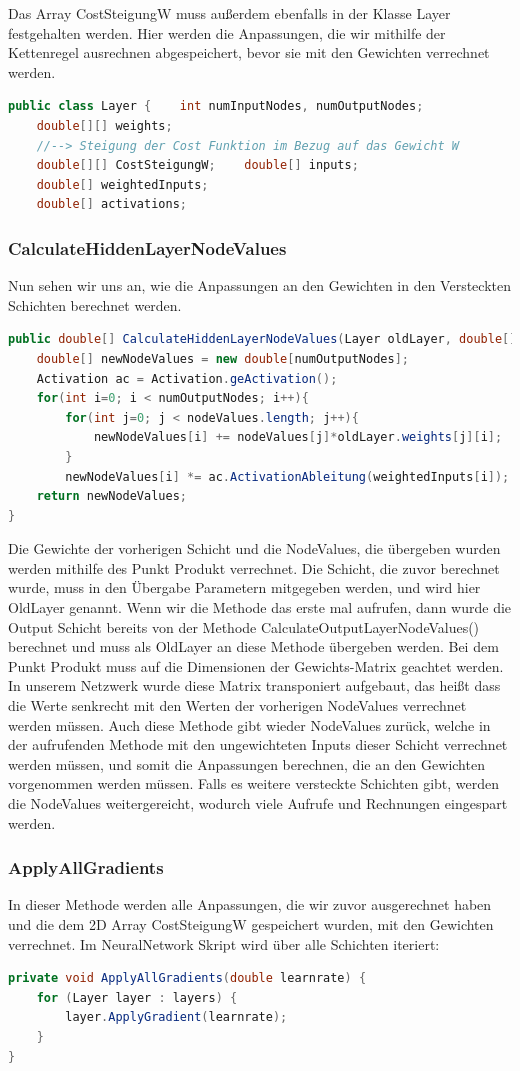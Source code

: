 \documentclass[12pt]{article}
\begin{document}
Das Array CostSteigungW muss außerdem ebenfalls in der Klasse Layer festgehalten werden. Hier werden die Anpassungen, die wir mithilfe der Kettenregel ausrechnen abgespeichert, bevor sie mit den Gewichten verrechnet werden.\begin{lstlisting}[language=Java]
public class Layer {    int numInputNodes, numOutputNodes;
    double[][] weights;
    //--> Steigung der Cost Funktion im Bezug auf das Gewicht W
    double[][] CostSteigungW;    double[] inputs;
    double[] weightedInputs;
    double[] activations;
\end{lstlisting}
\subsubsection{CalculateHiddenLayerNodeValues}Nun sehen wir uns an, wie die Anpassungen an den Gewichten in den Versteckten Schichten berechnet werden.\begin{lstlisting}[language=Java]
public double[] CalculateHiddenLayerNodeValues(Layer oldLayer, double[] nodeValues) {
    double[] newNodeValues = new double[numOutputNodes];
    Activation ac = Activation.geActivation();
    for(int i=0; i < numOutputNodes; i++){
        for(int j=0; j < nodeValues.length; j++){
            newNodeValues[i] += nodeValues[j]*oldLayer.weights[j][i];
        } 
        newNodeValues[i] *= ac.ActivationAbleitung(weightedInputs[i]);
    return newNodeValues;
}
\end{lstlisting}
Die Gewichte der vorherigen Schicht und die NodeValues, die übergeben wurden werden mithilfe des Punkt Produkt verrechnet. Die Schicht, die zuvor berechnet wurde, muss in den Übergabe Parametern mitgegeben werden, und wird hier OldLayer genannt. Wenn wir die Methode das erste mal aufrufen, dann wurde die Output Schicht bereits von der Methode CalculateOutputLayerNodeValues() berechnet und muss als OldLayer an diese Methode übergeben werden.
Bei dem Punkt Produkt muss auf die Dimensionen der Gewichts-Matrix geachtet werden. In unserem Netzwerk wurde diese Matrix transponiert aufgebaut, das heißt dass die Werte senkrecht mit den Werten der vorherigen NodeValues verrechnet werden müssen. Auch diese Methode gibt wieder NodeValues zurück, welche in der aufrufenden Methode mit den ungewichteten Inputs dieser Schicht verrechnet werden müssen, und somit die Anpassungen berechnen, die an den Gewichten vorgenommen werden müssen. Falls es weitere versteckte Schichten gibt, werden die NodeValues weitergereicht, wodurch viele Aufrufe und Rechnungen eingespart werden.\subsubsection{ApplyAllGradients}In dieser Methode werden alle Anpassungen, die wir zuvor ausgerechnet haben und die dem 2D Array CostSteigungW gespeichert wurden, mit den Gewichten verrechnet. Im NeuralNetwork Skript wird über alle Schichten iteriert:\begin{lstlisting}[language=Java]
private void ApplyAllGradients(double learnrate) {
    for (Layer layer : layers) {
        layer.ApplyGradient(learnrate);
    }
}
\end{lstlisting}
\end{document}
